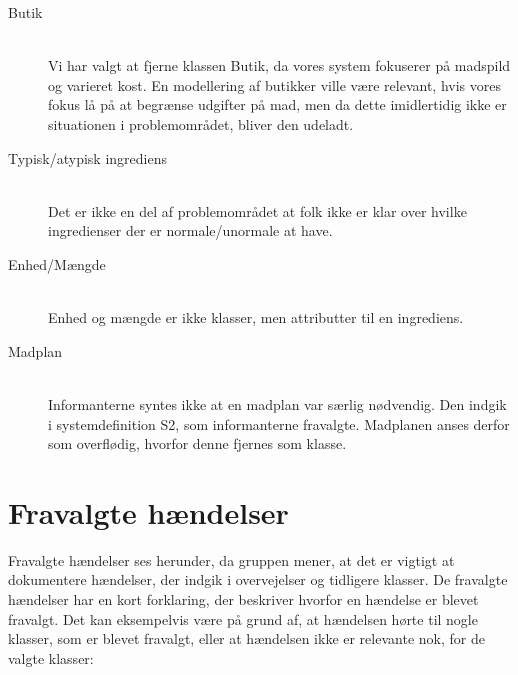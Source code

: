 \begin{description}
\item[Butik] \hfill \\
Vi har valgt at fjerne klassen Butik, da vores system fokuserer på madspild og varieret kost. En modellering af butikker ville være relevant, hvis vores fokus lå på at begrænse udgifter på mad, men da dette imidlertidig ikke er situationen i problemområdet, bliver den udeladt.

\item[Typisk/atypisk ingrediens] \hfill \\
Det er ikke en del af problemområdet at folk ikke er klar over hvilke ingredienser der er normale/unormale at have.

\item[Enhed/Mængde] \hfill \\
Enhed og mængde er ikke klasser, men attributter til en ingrediens.

\item[Madplan] \hfill \\
Informanterne syntes ikke at en madplan var særlig nødvendig. Den indgik i systemdefinition S2, som informanterne fravalgte. Madplanen anses derfor som overflødig, hvorfor denne fjernes som klasse.
\end{description}

\section{Fravalgte hændelser}
Fravalgte hændelser ses herunder, da gruppen mener, at det er vigtigt at dokumentere hændelser, der indgik i overvejelser og tidligere klasser. De fravalgte hændelser har en kort forklaring, der beskriver hvorfor en hændelse er blevet fravalgt. Det kan eksempelvis være på grund af, at hændelsen hørte til nogle klasser, som er blevet fravalgt, eller at hændelsen ikke er relevante nok, for de valgte klasser:

